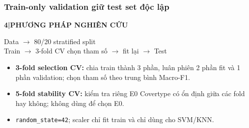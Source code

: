\documentclass[aspectratio=169,12pt]{beamer}
\newcommand{\chaptertag}[2]{%
  \vspace{-0.16cm}%
  {\scriptsize\bfseries\textcolor{boxframe}{#1\enspace |\enspace #2}}\par
  \vspace{0.12cm}%
}
\begin{document}
\begin{frame}
  \frametitle{Train-only validation giữ test set độc lập}
  \chaptertag{4}{PHƯƠNG PHÁP NGHIÊN CỨU}
  \begin{tcolorbox}[focusbox,width=0.93\textwidth,top=4mm,bottom=4mm]
    \centering\large
    Data $\longrightarrow$ 80/20 stratified split\\[0.28cm]
    Train $\longrightarrow$ 3-fold CV chọn tham số $\longrightarrow$ fit lại $\longrightarrow$ Test
  \end{tcolorbox}
  \vspace{0.38cm}
  \begin{itemize}
    \item \textbf{3-fold selection CV:} chia train thành 3 phần, luân phiên 2 phần fit và 1 phần validation; chọn tham số theo trung bình Macro-F1.
    \item \textbf{5-fold stability CV:} kiểm tra riêng E0 Covertype có ổn định giữa các fold hay không; không dùng để chọn E0.
    \item \texttt{random\_state=42}; scaler chỉ fit train và chỉ dùng cho SVM/KNN.
  \end{itemize}
\end{frame}
\end{document}
